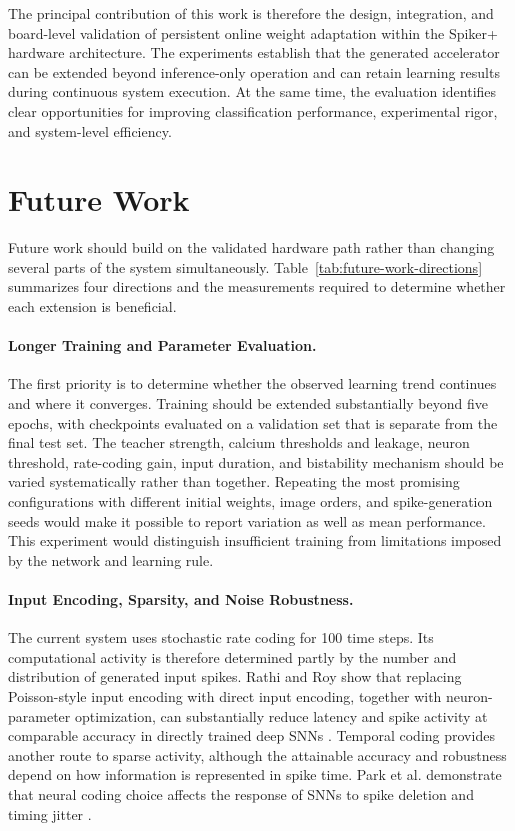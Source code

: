The principal contribution of this work is therefore the design, integration, and board-level validation of persistent online weight adaptation within the Spiker+ hardware architecture. The experiments establish that the generated accelerator can be extended beyond inference-only operation and can retain learning results during continuous system execution. At the same time, the evaluation identifies clear opportunities for improving classification performance, experimental rigor, and system-level efficiency.

\section{Future Work}

Future work should build on the validated hardware path rather than changing several parts of the system simultaneously. Table~\ref{tab:future-work-directions} summarizes four directions and the measurements required to determine whether each extension is beneficial.



\paragraph{Longer Training and Parameter Evaluation.}
The first priority is to determine whether the observed learning trend continues and where it converges. Training should be extended substantially beyond five epochs, with checkpoints evaluated on a validation set that is separate from the final test set. The teacher strength, calcium thresholds and leakage, neuron threshold, rate-coding gain, input duration, and bistability mechanism should be varied systematically rather than together. Repeating the most promising configurations with different initial weights, image orders, and spike-generation seeds would make it possible to report variation as well as mean performance. This experiment would distinguish insufficient training from limitations imposed by the network and learning rule.

\paragraph{Input Encoding, Sparsity, and Noise Robustness.}
The current system uses stochastic rate coding for 100 time steps. Its computational activity is therefore determined partly by the number and distribution of generated input spikes. Rathi and Roy show that replacing Poisson-style input encoding with direct input encoding, together with neuron-parameter optimization, can substantially reduce latency and spike activity at comparable accuracy in directly trained deep SNNs \cite{Rathi2023DIETSNN}. Temporal coding provides another route to sparse activity, although the attainable accuracy and robustness depend on how information is represented in spike time. Park et al. demonstrate that neural coding choice affects the response of SNNs to spike deletion and timing jitter \cite{Park2021NoiseRobust}.

